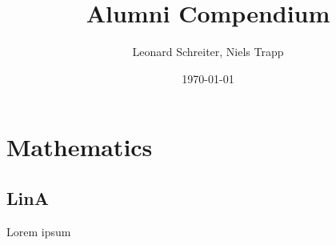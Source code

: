 \documentclass[12pt,a4paper]{report}
\title{Alumni Compendium}           %
\author{Leonard Schreiter, Niels Trapp}          %
\date{\today}           %
\begin{document}
    \maketitle

    \tableofcontents

    \chapter{Mathematics}
        \section{LinA}

    Lorem ipsum
\end{document}
